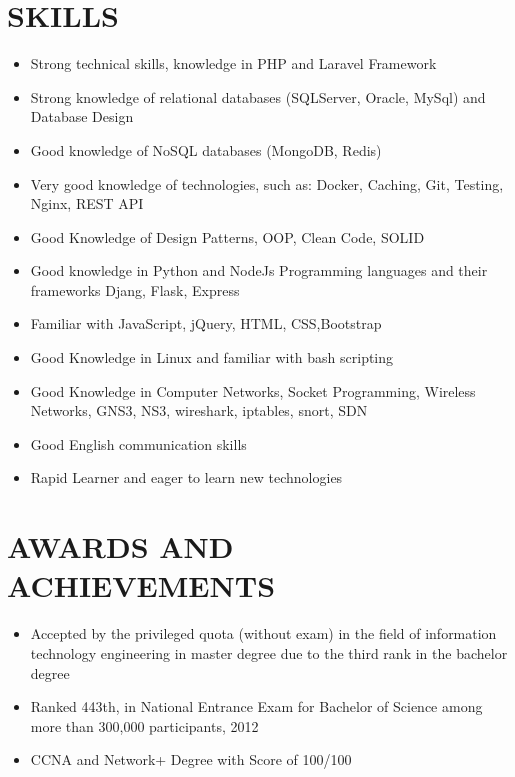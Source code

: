 \documentclass[11pt,a4paper,roman]{moderncv}
\begin{document}
{{{{\section{SKILLS}
\begin{minipage}{\maincolumnwidth}%
	\small{
    	\begin{itemize}
          \item Strong technical skills, knowledge in PHP and Laravel Framework
          \item Strong knowledge of relational databases (SQLServer, Oracle, MySql) and Database Design
          \item Good knowledge of NoSQL databases (MongoDB, Redis)
           \item Very good knowledge of technologies, such as: Docker, Caching, Git, Testing, Nginx, REST API
            \item Good Knowledge of Design Patterns, OOP, Clean Code, SOLID
             \item Good knowledge in Python and NodeJs Programming languages and their frameworks Djang, Flask, Express
              \item Familiar with JavaScript, jQuery, HTML, CSS,Bootstrap
               \item Good Knowledge in Linux and familiar with bash scripting
                \item Good Knowledge in Computer Networks, Socket Programming, Wireless Networks, GNS3, NS3, wireshark, iptables, snort, SDN
                \item Good English communication skills
                  \item Rapid Learner and eager to learn new technologies
		\end{itemize}}%
\end{minipage}%
      
}


\section{AWARDS AND ACHIEVEMENTS}
\begin{minipage}{\maincolumnwidth}%
	\small{
    	\begin{itemize}
          \item Accepted by the privileged quota (without exam) in the field of information technology engineering in master degree due to the third rank in the bachelor degree
          \item Ranked 443th, in National Entrance Exam for Bachelor of Science among more than 300,000 participants, 2012
          \item CCNA and Network+ Degree with Score of 100/100
		\end{itemize}}%
\end{minipage}%
      
}}}
\end{document}

